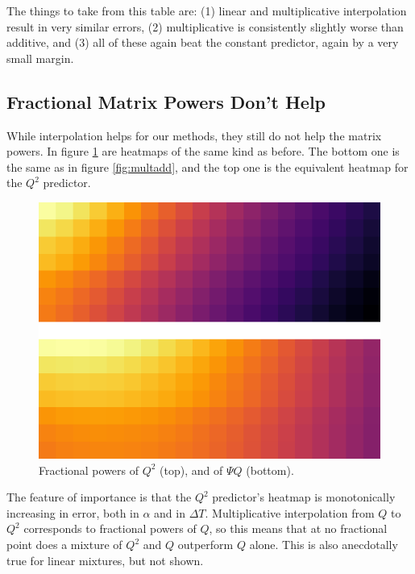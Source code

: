 \documentclass{article}
\theoremstyle{definition}
\begin{document}
	The things to take from this table are: (1) linear and multiplicative interpolation result in very similar errors, (2) multiplicative is consistently slightly worse than additive, and (3) all of these again beat the constant predictor, again by a very small margin. 
	

	
	\subsection{Fractional Matrix Powers Don't Help}
	While interpolation helps for our methods, they still do not help the matrix powers. In figure \ref{fig:fracmat} are heatmaps of the same kind as before. The bottom one is the same as in figure \ref{fig:multadd}, and the top one is the equivalent heatmap for the $Q^2$ predictor. 
	
	
	\begin{figure}
		\includegraphics[width=\linewidth]{figs/heatmaps/multiiplicative_interp_Q,Q2,trans_alt.png}
		\caption{\color{darkgray} Fractional powers of $Q^2$ (top), and of $\Psi Q$ (bottom).}
		\label{fig:fracmat}
	\end{figure}
	The feature of importance is that the $Q^2$ predictor's heatmap is monotonically increasing in error, both in $\alpha$ and in $\Delta T$. Multiplicative interpolation from $Q$ to $Q^2$ corresponds to fractional powers of $Q$, so this means that at no fractional point does a mixture of $Q^2$ and $Q$ outperform $Q$ alone. This is also anecdotally true for linear mixtures, but not shown.
		 
	
\end{document}
